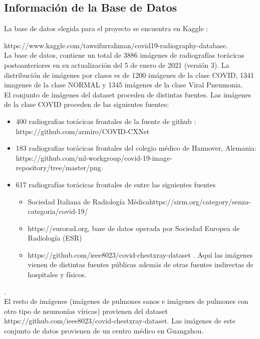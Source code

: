 \documentclass[11pt,a4paper]{article}
\theoremstyle{definition}
\begin{document}
\subsection{Información de la Base de Datos}
La base de datos elegida para el proyecto se encuentra en Kaggle :

https://www.kaggle.com/tawsifurrahman/covid19-radiography-database.\\

La base de datos, contiene un total de 3886 imágenes de radiografías torácicas postoanteriores en su actualización del 5 de enero de 2021 (versión 3). La distribución de imágenes por clases es de 1200 imágenes de la clase COVID, 1341 imagenes de la clase NORMAL y 1345 imágenes de la clase Viral Pneumonia.\\

El conjunto de imágenes del dataset proceden de distintas fuentes. Las imágenes de la clase COVID proceden de las siguientes fuentes:
\begin{itemize}
\item 400 radiografias torácicas frontales de la fuente de github : https://github.com/armiro/COVID-CXNet
\item 183  radiografias torácicas frontales del colegio médico de Hannover, Alemania: https://github.com/ml-workgroup/covid-19-image-repository/tree/master/png.
\item 617 radiografías torácicas frontales de entre las siguientes fuentes
\begin{itemize}
\item Sociedad Italiana de Radiología Médicahttps://sirm.org/category/senza-categoria/covid-19/

\item https://eurorad.org, base de datos operada por Sociedad Europea de Radiología (ESR)

\item https://github.com/ieee8023/covid-chestxray-dataset . Aquí las imágenes vienen de distintas fuentes públicas además de otras fuentes indirectas de hospitales y físicos.
\end{itemize}
\end{itemize}.\\

El resto de imágenes (imágenes de pulmones sanos e imágenes de pulmones con otro tipo de neumonías víricas) provienen del dataset https://github.com/ieee8023/covid-chestxray-dataset.  Las imágenes de este conjunto de datos provienen de un centro médico en Guangzhou.\\
\end{document}
